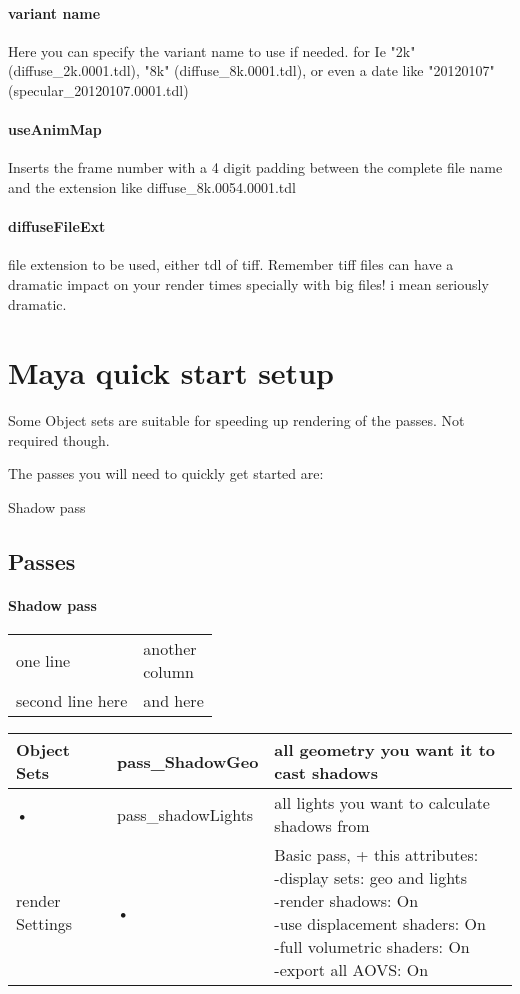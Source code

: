 \documentclass[final,letterpaper,twoside,12pt]{report}
\begin{document}
\subsubsection {variant name}
Here you can specify the variant name to use if needed. for Ie "2k" (diffuse\_2k.0001.tdl), "8k" (diffuse\_8k.0001.tdl), or even a date like "20120107" (specular\_20120107.0001.tdl)
\smallskip
\subsubsection {useAnimMap}
Inserts the frame number with a 4 digit padding between the complete file name and the extension like diffuse\_8k.0054.0001.tdl
\subsubsection {diffuseFileExt}
file extension to be used, either tdl of tiff.
Remember tiff files can have a dramatic impact on your render times specially with big files! i mean seriously dramatic.
\smallskip

\chapter{Maya quick start setup}
Some Object sets are suitable for speeding up rendering of the passes. Not required though.

The passes you will need to quickly get started are:

Shadow pass

\section {Passes}
\subsubsection {Shadow pass}
\begin{tabular}{ll}
one line& \parbox[t]{5cm}{another\\column}\\
second line here& and here
\end{tabular}

\footnotesize
\begin{tabular}{|l|l|l|}
\hline 
Object Sets & pass\_ShadowGeo & all geometry you want it to cast shadows  \\ 
\hline 
• & pass\_shadowLights & all lights you want to calculate shadows from \\ 
\hline 
render Settings & • & 
\parbox[t]{5cm}{Basic pass, + this attributes:\\
-display sets: geo and lights\\
-render shadows: On\\
-use displacement shaders: On\\
-full volumetric shaders: On\\
-export all AOVS: On\\}
\\ 
\hline 
\end{tabular} 
\end{document}

